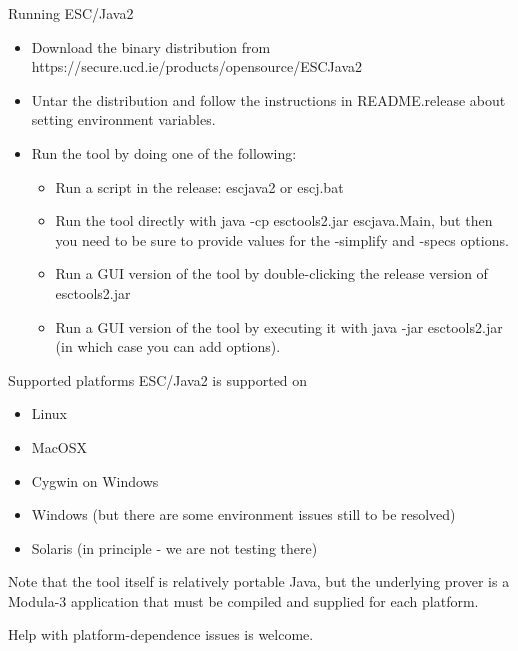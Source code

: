 \documentclass[
pdf,
nocolorBG,
slideColor,
cok,
]{prosper}
\begin{document}
\begin{slide}{Running ESC/Java2}
\vspace*{-6ex}
\begin{itemize}
\item Download the binary distribution from {\green https://secure.ucd.ie/products/opensource/ESCJava2}
\item Untar the distribution and follow the instructions in {\green README.release} about setting environment variables.
\item Run the tool by doing one of the following:
\begin{itemize}
\item Run a script in the release: {\green escjava2} or {\green escj.bat}
\item Run the tool directly with {\green java -cp esctools2.jar escjava.Main}, but then you need to be sure to provide values for the {\blue -simplify} and {\blue -specs}  options.
\item Run a GUI version of the tool by double-clicking the release version of {\green esctools2.jar}
\item Run a GUI version of the tool by executing it with {\green java -jar esctools2.jar} (in which case you can add options).
\end{itemize}
\end{itemize}
\end{slide}


\begin{slide}{Supported platforms}
\vspace*{-6ex}
ESC/Java2 is supported on
\begin{itemize}
\item Linux
\item MacOSX
\item Cygwin on Windows
\item Windows (but there are some environment issues still to be resolved)
\item Solaris (in principle - we are not testing there)
\end{itemize}
Note that the tool itself is relatively portable Java, but the underlying prover is a Modula-3 application that must be compiled and supplied for each platform.

Help with platform-dependence issues is welcome.
\end{slide}

\end{document}
